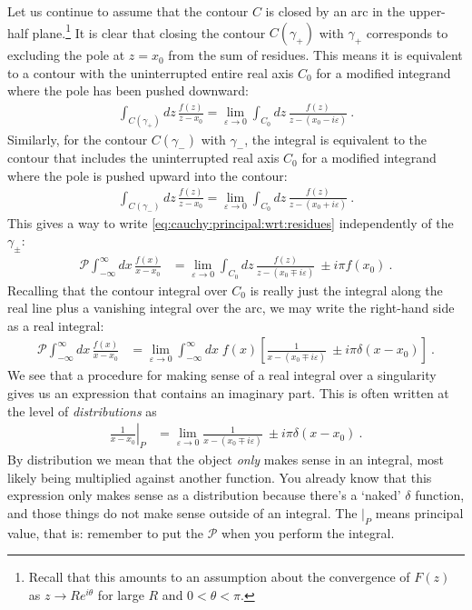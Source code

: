 Let us continue to assume that the contour $C$ is closed by an arc in the upper-half plane.\footnote{Recall that this amounts to an assumption about the convergence of $F(z)$ as $z\to Re^{i\theta}$ for large $R$ and $0 < \theta < \pi$.}
It is clear that closing the contour $C(\gamma_+)$ with $\gamma_+$ corresponds to excluding the pole at $z=x_0$ from the sum of residues. This means it is equivalent to a contour with the uninterrupted entire real axis $C_0$ for a modified integrand where the pole has been pushed downward:
\begin{align}
	\int_{C(\gamma_+)} dz \, \frac{f(z)}{z-x_0}
	=
	\lim_{\varepsilon\to 0}
	\int_{C_0} dz \, \frac{f(z)}{z-(x_0-i\varepsilon)} \ .
\end{align}
Similarly, for the contour $C(\gamma_-)$ with $\gamma_-$, the integral is equivalent to the contour that includes the uninterrupted real axis $C_0$ for a modified integrand where the pole is pushed upward into the contour:
\begin{align}
	\int_{C(\gamma_-)} dz \, \frac{f(z)}{z-x_0}
	=
	\lim_{\varepsilon\to 0}
	\int_{C_0} dz \, \frac{f(z)}{z-(x_0+i\varepsilon)} \ .
\end{align}
This gives a way to write \eqref{eq:cauchy:principal:wrt:residues} independently of the $\gamma_\pm$:
\begin{align}
	\mathcal P
	\int_{-\infty}^\infty dx\, \frac{f(x)}{x-x_0}
	&=
	\lim_{\varepsilon\to 0}
	\int_{C_0} dz \, \frac{f(z)}{z-(x_0\mp i\varepsilon)} \ 
	\pm i \pi f(x_0) \ .
\end{align}
Recalling that the contour integral over $C_0$ is really just the integral along the real line plus a vanishing integral over the arc, we may write the right-hand side as a real integral:
\begin{align}
	\mathcal P
	\int_{-\infty}^\infty dx\, \frac{f(x)}{x-x_0}
	&=
	\lim_{\varepsilon\to 0}
	\int_{-\infty}^\infty dx\; f(x)\left[
		\frac{1}{x-(x_0\mp i\varepsilon)} \ 
		\pm i \pi   \delta(x-x_0) 
	\right] 
	 \ .
\end{align}
We see that a procedure for making sense of a real integral over a singularity gives us an expression that contains an imaginary part. This is often written at the level of \emph{distributions} as
\begin{align}
	\left.\frac{1}{x-x_0}\right|_P
	&= 
	\lim_{\varepsilon\to 0}
		\frac{1}{x-(x_0\mp i\varepsilon)} \ 
		\pm i \pi   \delta(x-x_0) \ .
		\label{eq:cauchy:principal:as:distribution}
\end{align}
By distribution we mean that the object \emph{only} makes sense in an integral, most likely being multiplied against another function. You already know that this expression only makes sense as a distribution because there's a `naked' $\delta$ function, and those things do not make sense outside of an integral. The $\left.\right|_P$ means principal value, that is: remember to put the $\mathcal P$ when you perform the integral. 

